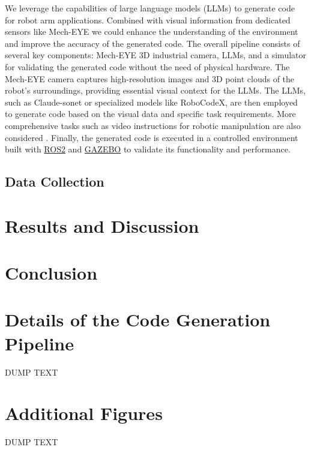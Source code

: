\documentclass[conference]{IEEEtran}
\begin{document}
We leverage the capabilities of large language models (LLMs) to generate code for robot arm applications. Combined with visual information from dedicated sensors like Mech-EYE we could enhance the understanding of the environment and improve the accuracy of the generated code. 
The overall pipeline consists of several key components: Mech-EYE 3D industrial camera, LLMs, and a simulator for validating the generated code without the need of physical hardware. The Mech-EYE camera captures high-resolution images and 3D point clouds of the robot's surroundings, providing essential visual context for the LLMs. The LLMs, such as Claude-sonet or specialized models like RoboCodeX\cite{mu2024robocodex}, are then employed to generate code based on the visual data and specific task requirements. More comprehensive tasks such as video instructions for robotic manipulation are also considered \cite{xie2025robotic}. 
Finally, the generated code is executed in a controlled environment built with \href{https://docs.ros.org/}{ROS2} and \href{http://gazebosim.org/}{GAZEBO} to validate its functionality and performance.

\subsection{Data Collection}



\section{Results and Discussion}
\section{Conclusion}

\appendices
\section{Details of the Code Generation Pipeline}
DUMP TEXT

\section{Additional Figures}
DUMP TEXT



\vspace{12pt}
\end{document}
